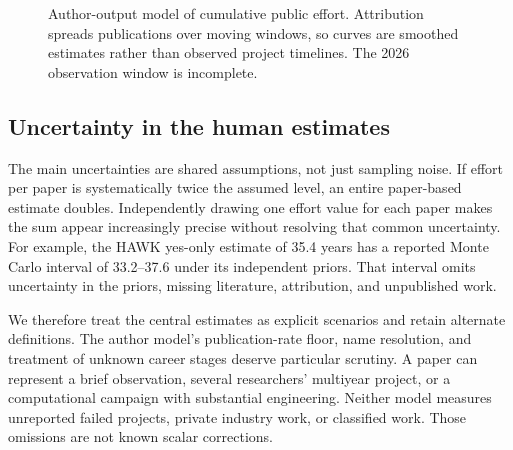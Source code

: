 \documentclass[11pt,letterpaper]{article}
\begin{document}
\begin{figure}[htbp]
\centering
{}
\caption{Author-output model of cumulative public effort. Attribution spreads publications over moving windows, so curves are smoothed estimates rather than observed project timelines. The 2026 observation window is incomplete.}
\label{fig:effort}
\end{figure}

\subsection{Uncertainty in the human estimates}
The main uncertainties are shared assumptions, not just sampling noise. If effort per paper is systematically twice the assumed level, an entire paper-based estimate doubles. Independently drawing one effort value for each paper makes the sum appear increasingly precise without resolving that common uncertainty. For example, the HAWK yes-only estimate of 35.4 years has a reported Monte Carlo interval of 33.2--37.6 under its independent priors. That interval omits uncertainty in the priors, missing literature, attribution, and unpublished work.

We therefore treat the central estimates as explicit scenarios and retain alternate definitions. The author model's publication-rate floor, name resolution, and treatment of unknown career stages deserve particular scrutiny. A paper can represent a brief observation, several researchers' multiyear project, or a computational campaign with substantial engineering. Neither model measures unreported failed projects, private industry work, or classified work. Those omissions are not known scalar corrections.
\end{document}
